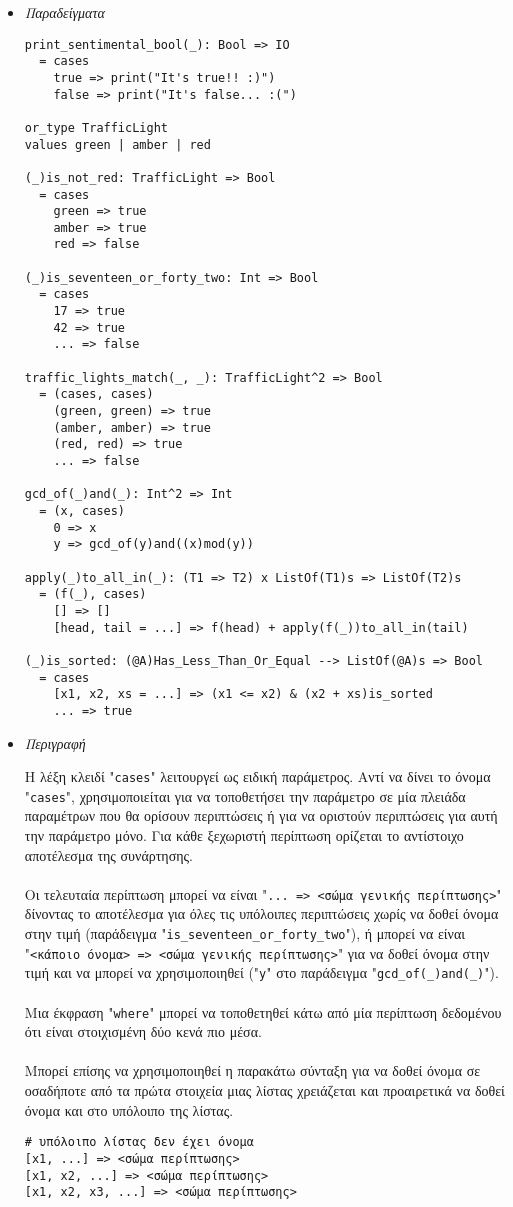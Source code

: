 \documentclass[diploma]{softlab-thesis}
\begin{document}
\begin{itemize}
\item \textit{Παραδείγματα}

\begin{verbatim}
print_sentimental_bool(_): Bool => IO
  = cases
    true => print("It's true!! :)")
    false => print("It's false... :(")

or_type TrafficLight
values green | amber | red

(_)is_not_red: TrafficLight => Bool
  = cases
    green => true
    amber => true
    red => false

(_)is_seventeen_or_forty_two: Int => Bool
  = cases
    17 => true
    42 => true
    ... => false

traffic_lights_match(_, _): TrafficLight^2 => Bool
  = (cases, cases)
    (green, green) => true
    (amber, amber) => true
    (red, red) => true
    ... => false

gcd_of(_)and(_): Int^2 => Int
  = (x, cases)
    0 => x
    y => gcd_of(y)and((x)mod(y))

apply(_)to_all_in(_): (T1 => T2) x ListOf(T1)s => ListOf(T2)s
  = (f(_), cases)
    [] => []
    [head, tail = ...] => f(head) + apply(f(_))to_all_in(tail)

(_)is_sorted: (@A)Has_Less_Than_Or_Equal --> ListOf(@A)s => Bool
  = cases
    [x1, x2, xs = ...] => (x1 <= x2) & (x2 + xs)is_sorted
    ... => true
\end{verbatim}

\newpage

\item \textit{Περιγραφή}

Η λέξη κλειδί "\verb|cases|" λειτουργεί ως ειδική παράμετρος.  Αντί να δίνει
το όνομα "\verb|cases|", χρησιμοποιείται για να τοποθετήσει την παράμετρο σε
μία πλειάδα παραμέτρων που θα ορίσουν περιπτώσεις ή για να οριστούν περιπτώσεις
για αυτή την παράμετρο μόνο.  Για κάθε ξεχωριστή περίπτωση ορίζεται το
αντίστοιχο αποτέλεσμα της συνάρτησης.
\\\\
Οι τελευταία περίπτωση μπορεί να είναι
"\verb|... => <σώμα γενικής περίπτωσης>|"
δίνοντας το αποτέλεσμα για όλες τις υπόλοιπες περιπτώσεις χωρίς να δοθεί όνομα
στην τιμή (παράδειγμα "\verb|is_seventeen_or_forty_two|"),
ή μπορεί να είναι \\
"\verb|<κάποιο όνομα> => <σώμα γενικής περίπτωσης>|"
για να δοθεί όνομα στην τιμή και να μπορεί να χρησιμοποιηθεί
("\verb|y|" στο παράδειγμα "\verb|gcd_of(_)and(_)|").
\\\\
Μια έκφραση "\verb|where|" μπορεί να τοποθετηθεί κάτω από μία περίπτωση
δεδομένου ότι είναι στοιχισμένη δύο κενά πιο μέσα.
\\\\
Μπορεί επίσης να χρησιμοποιηθεί η παρακάτω σύνταξη για να δοθεί όνομα
σε οσαδήποτε από τα πρώτα στοιχεία μιας λίστας χρειάζεται και προαιρετικά
να δοθεί όνομα και στο υπόλοιπο της λίστας.
\begin{verbatim}
# υπόλοιπο λίστας δεν έχει όνομα
[x1, ...] => <σώμα περίπτωσης>
[x1, x2, ...] => <σώμα περίπτωσης>
[x1, x2, x3, ...] => <σώμα περίπτωσης>


\end{verbatim}
\end{itemize}
\end{document}
